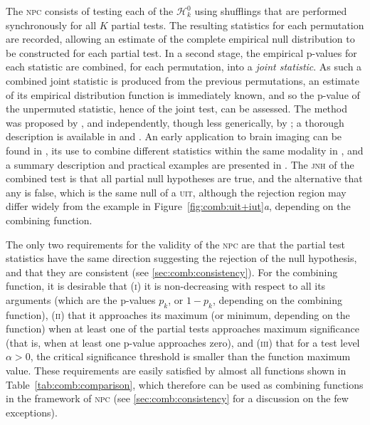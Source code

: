 The \textsc{npc} consists of testing each of the $\mathcal{H}^0_k$ using shufflings that are performed synchronously for all $K$ partial tests. The resulting statistics for each permutation are recorded, allowing an estimate of the complete empirical null distribution to be constructed for each partial test. In a second stage, the empirical p-values for each statistic are combined, for each permutation, into a \emph{joint statistic}. As such a combined joint statistic is produced from the previous permutations, an estimate of its empirical distribution function is immediately known, and so the p-value of the unpermuted statistic, hence of the joint test, can be assessed. The method was proposed by \citet{Pesarin1990, Pesarin1992}, and independently, though less generically, by \citet{Blair1994}; a thorough description is available in \citet{Pesarin2001} and \citet{Pesarin2010}. An early application to brain imaging can be found in \citet{Hayasaka2006}, its use to combine different statistics within the same modality in \citet{hayasaka2004_combining}, and a summary description and practical examples are presented in \citet{Brombin2013}. The \textsc{jnh} of the combined test is that all partial null hypotheses are true, and the alternative that any is false, which is the same null of a \textsc{uit}, although the rejection region may differ widely from the example in Figure~\ref{fig:comb:uit+iut}\emph{a}, depending on the combining function.

The only two requirements for the validity of the \textsc{npc} are that the partial test statistics have the same direction suggesting the rejection of the null hypothesis, and that they are consistent (see \ref{sec:comb:consistency}). For the combining function, it is desirable that (\textsc{i}) it is non-decreasing with respect to all its arguments (which are the p-values $p_k$, or $1-p_k$, depending on the combining function), (\textsc{ii}) that it approaches its maximum (or minimum, depending on the function) when at least one of the partial tests approaches maximum significance (that is, when at least one p-value approaches zero), and (\textsc{iii}) that for a test level $\alpha > 0$, the critical significance threshold is smaller than the function maximum value. These requirements are easily satisfied by almost all functions shown in Table~\ref{tab:comb:comparison}, which therefore can be used as combining functions in the framework of \textsc{npc} (see \ref{sec:comb:consistency} for a discussion on the few exceptions).

